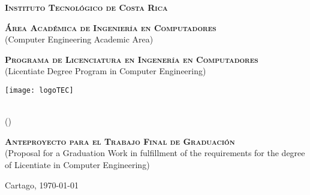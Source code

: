 
\thispagestyle{empty} 

\begin{center}

\textsc{\large \textbf{Instituto Tecnol\'ogico de Costa Rica}} \\
\par\vspace{7mm}


\textsc{\large \textbf{\'Area Acad\'emica de Ingenier\'ia en Computadores}}\\
(Computer Engineering Academic Area)\\
\par\vspace{7mm}

\textsc{\large \textbf{Programa de Licenciatura en Ingener\'ia en Computadores}}\\
(Licentiate Degree Program in Computer Engineering)



\par\vspace{20mm}

\texttt{[image: logoTEC]}

\par\vspace*{\fill}

{\LARGE\bf{\textsf{ \Large \scriptTitle}}}\\
(\scriptEnglishTitle)

\par\vspace*{\fill}

\textsc{\large \textbf{Anteproyecto para el Trabajo Final de Graduaci\'on}}\\
(Proposal for a Graduation Work in fulfillment of the requirements for the degree of 
Licentiate in Computer Engineering)

\par\vspace*{\fill}


\textsc{\large\bf \scriptAuthor}

\vspace*{\fill}

{Cartago, \today}

\end{center}
\newpage 
\cleardoublepage  
